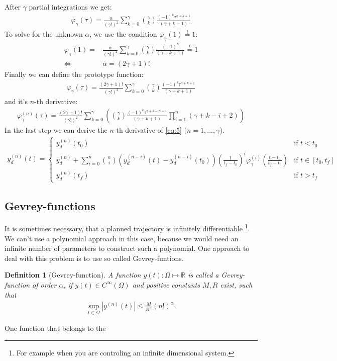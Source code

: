 \documentclass[a4paper,11pt,headings=standardclasses,parskip=half]{scrartcl}
\newtheorem{defi}{Definition}[section]
\newcommand{\R}{\mathbb{R}} %
\begin{document}
After $\gamma$ partial integrations we get:
\begin{align*}
\varphi_\gamma(\tau)= \frac{\alpha}{(\gamma!)^2} \sum_{k=0}^{\gamma} \binom{\gamma}{k} \frac{(-1)^k\tau^{\gamma+k+1}}{(\gamma+k+1)}
\end{align*}
To solve for the unknown $\alpha$, we use the condition $\varphi_\gamma(1)\overset{!}{=}1$:
\begin{align*}
\varphi_\gamma(1)= &\frac{\alpha}{(\gamma!)^2} \sum_{k=0}^{\gamma} \binom{\gamma}{k} \frac{(-1)^k}{(\gamma+k+1)} \overset{!}{=} 1 \\
\Leftrightarrow \quad & \alpha = (2\gamma+1)!
\end{align*}
Finally we can define the prototype function:
\begin{align}
\varphi_\gamma(\tau)= \frac{(2\gamma+1)!}{(\gamma!)^2} \sum_{k=0}^{\gamma} \binom{\gamma}{k} \frac{(-1)^k\tau^{\gamma+k+1}}{(\gamma+k+1)}
\end{align}
and it's $n$-th derivative:
\begin{align}
\varphi_\gamma^{(n)}(\tau)= \frac{(2\gamma+1)!}{(\gamma!)^2} \sum_{k=0}^{\gamma} \left(\binom{\gamma}{k} \frac{(-1)^k\tau^{\gamma+k-n+1}}{(\gamma+k+1)}\prod_{i=1}^n(\gamma+k-i+2)\right)
\end{align}
In the last step we can derive the $n$-th derivative of \eqref{eq:5} $(n=1,...,\gamma$).
\begin{align}
y_d^{(n)}(t) = \begin{cases} y_d^{(n)}(t_0) & \textrm{if } t<t_0 \\ 
y_d^{(n)} + \sum_{i=0}^{n}\binom{n}{i}(y_d^{(n-i)}(t)-y_d^{(n-i)}(t_0))\left(\frac{1}{t_f-t_0}\right)^i\varphi_\gamma^{(i)}\left(\frac{t-t_0}{t_f-t_0}\right) &\textrm{if } t \in [t_0, t_f] \\ 
y_d^{(n)}(t_f)&\textrm{if } t>t_f\end{cases}
\end{align}
\subsection{Gevrey-functions}
It is sometimes necessary, that a planned trajectory is infinitely differentiable \footnote{For example when you are controling an infinite dimensional system.}. We can't use a polynomial approach in this case, because we would need an infinite number of parameters to construct such a polynomial. One approach to deal with this problem is to use so called Gevrey-funtions.
\begin{defi}[Gevrey-function] A function $y(t):\Omega \mapsto \R$ is called a Gevrey-function of order $\alpha$, if $y(t) \in C^\infty(\Omega)$ and positive constants $M, R$ exist, such that
\begin{align*}
\sup_{t\in\Omega}{|y^{(n)}(t)| \leq \frac{M}{R^n}(n!)^\alpha}.
\end{align*}
\end{defi}
One function that belongs to the 
\end{document}
